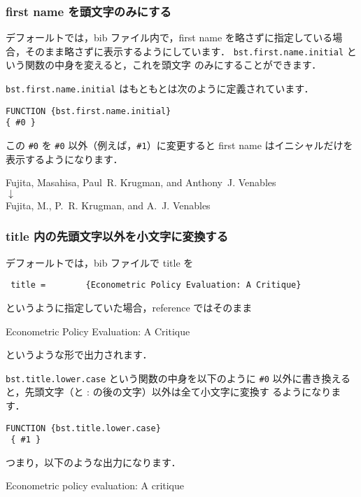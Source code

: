\documentclass[a4j,10pt]{jarticle}
\begin{document}
\subsubsection{first name を頭文字のみにする}

デフォールトでは，bib ファイル内で，first name を略さずに指定している場
合，そのまま略さずに表示するようにしています．
\texttt{bst.first.name.initial} という関数の中身を変えると，これを頭文字
のみにすることができます．

\texttt{bst.first.name.initial} はもともとは次のように定義されています．
\begin{screen}
\begin{verbatim}
FUNCTION {bst.first.name.initial}
{ #0 }
\end{verbatim}
\end{screen}
この \verb|#0| を \verb|#0| 以外（例えば，\verb|#1|）に変更すると
first name はイニシャルだけを表示するようになります．
\begin{center}
Fujita, Masahisa, Paul~R. Krugman, and Anthony~J. Venables \\
 $\downarrow$ \\
Fujita, M., P.~R. Krugman, and A.~J. Venables
\end{center}

\subsubsection{title 内の先頭文字以外を小文字に変換する}

デフォールトでは，bib ファイルで title を
\begin{center}
  \verb| title =        {Econometric Policy Evaluation: A Critique}|
\end{center}
というように指定していた場合，reference ではそのまま
\begin{center}
 Econometric Policy Evaluation: A Critique
\end{center}
というような形で出力されます．

\texttt{bst.title.lower.case} という関数の中身を以下のように \verb|#0| 
以外に書き換えると，先頭文字（と : の後の文字）以外は全て小文字に変換す
るようになります．
\begin{screen}
\begin{verbatim}
FUNCTION {bst.title.lower.case}
 { #1 }
\end{verbatim}
\end{screen}

つまり，以下のような出力になります．
\begin{center}
 Econometric policy evaluation: A critique
\end{center}
\end{document}
